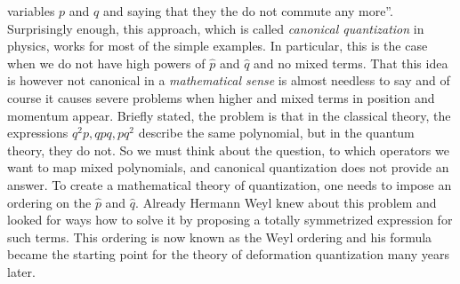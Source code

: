 variables $p$ and $q$ and saying that they the do not commute any more''. 
Surprisingly enough, this approach, which is called \emph{canonical quantization} 
in physics, works for most of the simple examples. In particular, this is the 
case when we do not have high powers of $\hat p$ and $\hat q$ and no 
mixed terms. That this idea is however not canonical in a \emph{mathematical 
sense} is almost needless to say and of course it causes severe problems when 
higher and mixed terms in position and momentum appear. Briefly stated, the 
problem is that in the classical theory, the expressions $q^2p, qpq, pq^2$ 
describe the same polynomial, but in the quantum theory, they do not. So we must 
think about the question, to which operators we want to map mixed polynomials, and 
canonical quantization does not provide an answer. To create a mathematical theory 
of quantization, one needs to impose an ordering on the $\hat p$ and $\hat q$. 
Already Hermann Weyl knew about this problem and looked for ways how to solve it 
by proposing a totally symmetrized expression \cite{weyl:1931a} for such terms. 
This ordering is now known as the Weyl ordering and his formula became the 
starting point for the theory of deformation quantization many years later.



